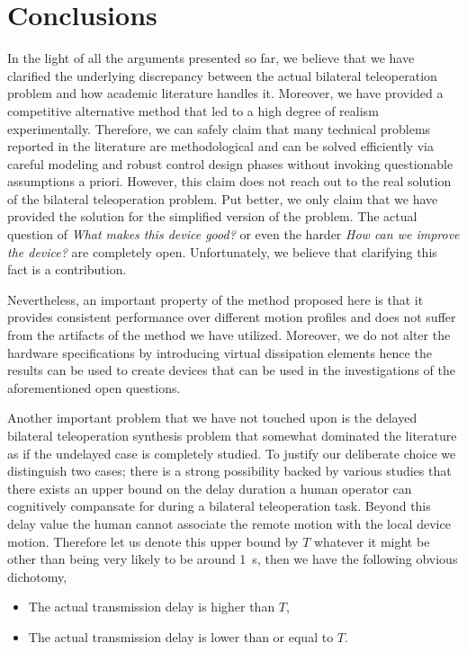\chapter{Conclusions}
\label{chap:conc}

In the light of all the arguments presented so far, we believe that we have clarified the underlying discrepancy between the actual bilateral 
teleoperation problem and how academic literature handles it. Moreover, we have provided a competitive alternative method that led to a high
degree of realism experimentally. Therefore, we can safely claim that many technical problems reported in the literature are methodological and 
can be solved efficiently via careful modeling and robust control design phases without invoking questionable assumptions a priori. 
However, this claim does not reach out to the real solution of the bilateral teleoperation problem. Put better, we only claim that we have provided
the solution for the simplified version of the problem. The actual question of \emph{What makes this device good?} or even the harder 
\emph{How can we improve the device?} are completely open. Unfortunately, we believe that clarifying this fact is a contribution.

Nevertheless, an important property of the method proposed here is that it provides consistent performance over different motion profiles and 
does not suffer from the artifacts of the method we have utilized. Moreover, we do not alter the hardware specifications by introducing 
virtual dissipation elements hence the results can be used to create devices that can be used in the investigations of the aforementioned 
open questions.  

Another important problem that we have not touched upon is the delayed bilateral teleoperation synthesis problem that somewhat dominated the
literature as if the undelayed case is completely studied. To justify our deliberate choice we distinguish two cases; there is a strong 
possibility backed by various studies that there exists an upper bound on the delay duration a human operator can cognitively compansate for 
during a bilateral teleoperation task. Beyond this delay value the human cannot associate the remote motion with the local device motion. 
Therefore let us denote this upper bound by $T$ whatever it might be other than being very likely to be around \SI{1}{\second}, then we 
have the following obvious dichotomy,

\begin{itemize}
	\item The actual transmission delay is higher than $T$,
    \item The actual transmission delay is lower than or equal to $T$.
\end{itemize}

